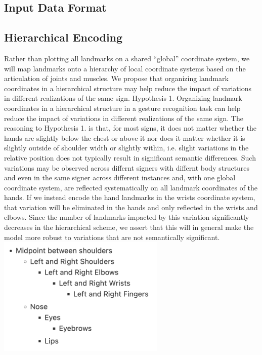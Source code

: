 \documentclass[10pt,twocolumn,letterpaper]{article}
\begin{document}
\begin{CJK*}{UTF8}{bsmi}
{}


\section{Input Data Format}
\label{sec:formatting}


\subsection{Hierarchical Encoding}
{\color{blue} 
Rather than plotting all landmarks on a shared “global” coordinate system, we will map landmarks onto a hierarchy of local coordinate systems based on the articulation of joints and muscles. We propose that organizing landmark coordinates in a hierarchical structure may help reduce the impact of variations in different realizations of the same sign.
Hypothesis 1. Organizing landmark coordinates in a hierarchical structure in a gesture recognition task can help reduce the impact of variations in different realizations of the same sign.
The reasoning to Hypothesis 1. is that, for most signs, it does not matter whether the hands are slightly below the chest or above it nor does it matter whether it is slightly outside of shoulder width or slightly within, i.e. slight variations in the relative position does not typically result in significant semantic differences. Such variations may be observed across differnt signers with differnt body structures and even in the same signer across different instances and, with one global coordinate system, are reflected systematically on all landmark coordinates of the hands. If we instead encode the hand landmarks in the wrists coordinate system, that variation will be eliminated in the hands and only reflected in the wrists and elbows. Since the number of landmarks impacted by this variation significantly decreases in the hierarchical scheme, we assert that this will in general make the model more robust to variations that are not semantically significant.
}
\includegraphics[width=80mm]{hierarchical_scheme}


\end{CJK*}
\end{document}

